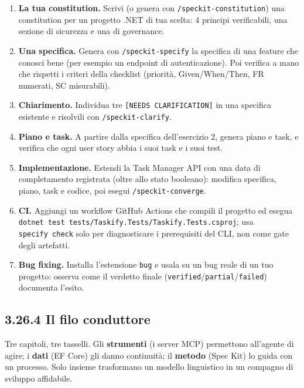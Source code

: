 \documentclass[
  italian,
  10pt,
]{book}
\providecommand{\tightlist}{%
  \setlength{\itemsep}{0pt}\setlength{\parskip}{0pt}}
\begin{document}
\begin{enumerate}
\def\labelenumi{\arabic{enumi}.}
\tightlist
\item
  \textbf{La tua constitution.} Scrivi (o genera con
  \texttt{/speckit-constitution}) una constitution per un progetto .NET
  di tua scelta: 4 principi verificabili, una sezione di sicurezza e una
  di governance.
\item
  \textbf{Una specifica.} Genera con \texttt{/speckit-specify} la
  specifica di una feature che conosci bene (per esempio un endpoint di
  autenticazione). Poi verifica a mano che rispetti i criteri della
  checklist (priorità, Given/When/Then, FR numerati, SC misurabili).
\item
  \textbf{Chiarimento.} Individua tre
  \texttt{{[}NEEDS\ CLARIFICATION{]}} in una specifica esistente e
  risolvili con \texttt{/speckit-clarify}.
\item
  \textbf{Piano e task.} A partire dalla specifica dell'esercizio 2,
  genera piano e task, e verifica che ogni user story abbia i suoi task
  e i suoi test.
\item
  \textbf{Implementazione.} Estendi la Task Manager API con una data di
  completamento registrata (oltre allo stato booleano): modifica
  specifica, piano, task e codice, poi esegui
  \texttt{/speckit-converge}.
\item
  \textbf{CI.} Aggiungi un workflow GitHub Actions che compili il
  progetto ed esegua
  \texttt{dotnet\ test\ tests/Taskify.Tests/Taskify.Tests.csproj}; usa
  \texttt{specify\ check} solo per diagnosticare i prerequisiti del CLI,
  non come gate degli artefatti.
\item
  \textbf{Bug fixing.} Installa l'estensione \texttt{bug} e usala su un
  bug reale di un tuo progetto: osserva come il verdetto finale
  (\texttt{verified}/\texttt{partial}/\texttt{failed}) documenta
  l'esito.
\end{enumerate}

\subsection{3.26.4 Il filo conduttore}\label{il-filo-conduttore}

Tre capitoli, tre tasselli. Gli \textbf{strumenti} (i server MCP)
permettono all'agente di agire; i \textbf{dati} (EF Core) gli danno
continuità; il \textbf{metodo} (Spec Kit) lo guida con un processo. Solo
insieme trasformano un modello linguistico in un compagno di sviluppo
affidabile.
\end{document}
